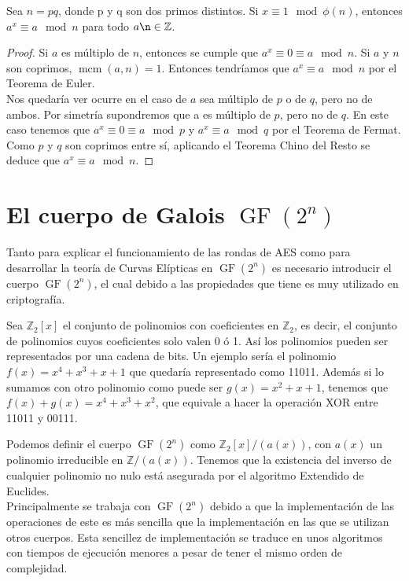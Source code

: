 \begin{proposicion}
	Sea $n = pq$, donde p y q son dos primos distintos. Si $x\equiv 1 \mod \phi(n)$, entonces $a^x\equiv a\mod n$ para todo $ a \n \in \mathbb{Z}$.
\end{proposicion}\vspace*{-5mm}

	\begin{proof}
		Si $a$ es múltiplo de $n$, entonces se cumple que $a^x \equiv 0 \equiv a \mod n$. Si $a$ y $n$ son coprimos, $\operatorname{mcm}(a,n) = 1$. Entonces tendríamos que $a^x \equiv a \mod n$ por el Teorema de Euler.\\
		Nos quedaría ver ocurre en el caso de $a$ sea múltiplo de $p$ o de $q$, pero no de ambos. Por simetría supondremos que a es múltiplo de $p$, pero no de $q$. En este caso tenemos que $a^x \equiv 0 \equiv a \mod p$  y $a^x \equiv a \mod q$ por el Teorema de Fermat. Como $p$ y $q$ son coprimos entre sí, aplicando el Teorema Chino del Resto se deduce que $a^x \equiv a \mod n$.\qedhere
	\end{proof}

\section{El cuerpo de Galois $\operatorname{GF}(2^n)$}
Tanto para explicar el funcionamiento de las rondas de AES como para desarrollar la teoría de Curvas Elípticas en $\operatorname{GF}(2^n)$ es necesario introducir el cuerpo $\operatorname{GF}(2^n)$, el cual debido a las propiedades que tiene es muy utilizado en criptografía.

Sea $\mathbb{Z}_2[x]$ el conjunto de polinomios con coeficientes en $\mathbb{Z}_2$, es decir, el conjunto de polinomios cuyos coeficientes solo valen 0 ó 1. Así los polinomios pueden ser representados por una cadena de bits.
 Un ejemplo sería el polinomio $f(x)=x^4+x^3+x+1$ que quedaría representado como 11011. 
Además si lo sumamos con otro polinomio como puede ser $g(x)=x^2+x+1$, tenemos que $f(x)+g(x)=x^4+x^3+x^2$, que equivale a hacer la operación XOR entre 11011 y 00111.

Podemos definir el cuerpo $\operatorname{GF}(2^n)$ como $\mathbb{Z}_2[x]/(a(x))$, con $a(x)$ un polinomio irreducible en $\mathbb{Z}/(a(x))$. Tenemos que la existencia del inverso de cualquier polinomio no nulo está asegurada por el algoritmo Extendido de Euclides.\\ 
Principalmente se trabaja con $\operatorname{GF}(2^n)$ debido a que la implementación de las operaciones de este es más sencilla que la implementación en las que se utilizan otros cuerpos. Esta sencillez de implementación se traduce en unos algoritmos con tiempos de ejecución menores a pesar de tener el mismo orden de complejidad.

